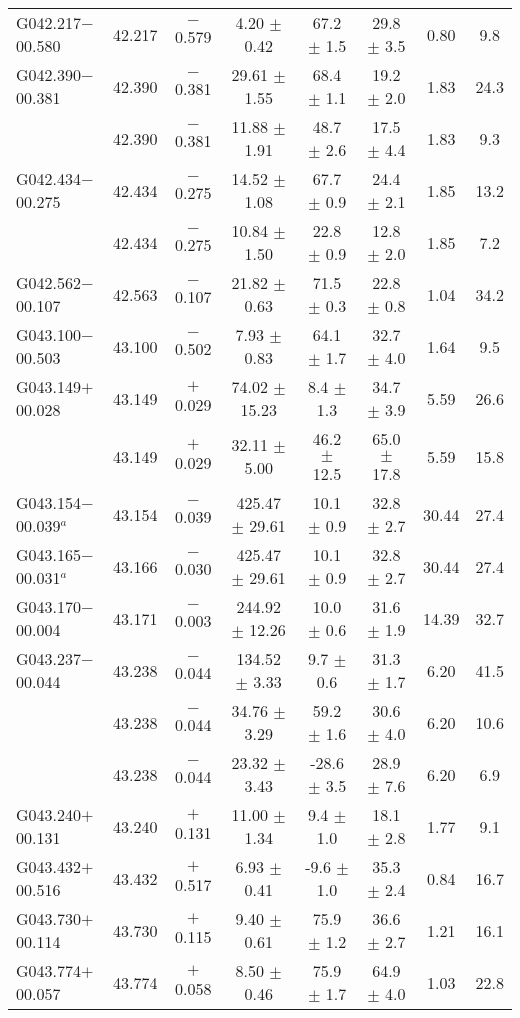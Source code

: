 \begin{ThreePartTable}
\begin{longtable}{lccccccc}
G042.217$-$00.580     &42.217&	$-$0.579	&4.20	$\pm$ 0.42	&67.2	$\pm$ 1.5	&29.8	$\pm$ 3.5	&0.80	&9.8\\
G042.390$-$00.381     &42.390&	$-$0.381	&29.61	$\pm$ 1.55	&68.4	$\pm$ 1.1	&19.2	$\pm$ 2.0	&1.83	&24.3\\
                      &42.390&	$-$0.381	&11.88	$\pm$ 1.91	&48.7	$\pm$ 2.6	&17.5	$\pm$ 4.4	&1.83	&9.3\\
G042.434$-$00.275     &42.434&	$-$0.275	&14.52	$\pm$ 1.08	&67.7	$\pm$ 0.9	&24.4	$\pm$ 2.1	&1.85	&13.2\\
                      &42.434&	$-$0.275	&10.84	$\pm$ 1.50	&22.8	$\pm$ 0.9	&12.8	$\pm$ 2.0	&1.85	&7.2\\
G042.562$-$00.107     &42.563&	$-$0.107	&21.82	$\pm$ 0.63	&71.5	$\pm$ 0.3	&22.8	$\pm$ 0.8	&1.04	&34.2\\
G043.100$-$00.503     &43.100&	$-$0.502	&7.93	$\pm$ 0.83	&64.1	$\pm$ 1.7	&32.7	$\pm$ 4.0	&1.64	&9.5\\
G043.149$+$00.028     &43.149&	$+$0.029	&74.02	$\pm$ 15.23	&8.4	$\pm$ 1.3	&34.7	$\pm$ 3.9	&5.59	&26.6\\
                      &43.149&	$+$0.029	&32.11	$\pm$ 5.00	&46.2	$\pm$ 12.5	&65.0	$\pm$ 17.8	&5.59	&15.8\\
G043.154$-$00.039$^a$ &43.154&	$-$0.039	&425.47	$\pm$ 29.61	&10.1	$\pm$ 0.9	&32.8	$\pm$ 2.7	&30.44	&27.4\\
G043.165$-$00.031$^a$ &43.166&	$-$0.030	&425.47	$\pm$ 29.61	&10.1	$\pm$ 0.9	&32.8	$\pm$ 2.7	&30.44	&27.4\\
G043.170$-$00.004     &43.171&	$-$0.003	&244.92	$\pm$ 12.26	&10.0	$\pm$ 0.6	&31.6	$\pm$ 1.9	&14.39	&32.7\\
G043.237$-$00.044     &43.238&	$-$0.044	&134.52	$\pm$ 3.33	&9.7	$\pm$ 0.6	&31.3	$\pm$ 1.7	&6.20	&41.5\\
                      &43.238&	$-$0.044	&34.76	$\pm$ 3.29	&59.2	$\pm$ 1.6	&30.6	$\pm$ 4.0	&6.20	&10.6\\
                      &43.238&	$-$0.044	&23.32	$\pm$ 3.43	&-28.6	$\pm$ 3.5	&28.9	$\pm$ 7.6	&6.20	&6.9\\
G043.240$+$00.131     &43.240&	$+$0.131	&11.00	$\pm$ 1.34	&9.4	$\pm$ 1.0	&18.1	$\pm$ 2.8	&1.77	&9.1\\
G043.432$+$00.516     &43.432&	$+$0.517	&6.93	$\pm$ 0.41	&-9.6	$\pm$ 1.0	&35.3	$\pm$ 2.4	&0.84	&16.7\\
G043.730$+$00.114     &43.730&	$+$0.115	&9.40	$\pm$ 0.61	&75.9	$\pm$ 1.2	&36.6	$\pm$ 2.7	&1.21	&16.1\\
G043.774$+$00.057     &43.774&	$+$0.058	&8.50	$\pm$ 0.46	&75.9	$\pm$ 1.7	&64.9	$\pm$ 4.0	&1.03	&22.8\\

\end{longtable}
\end{ThreePartTable}
